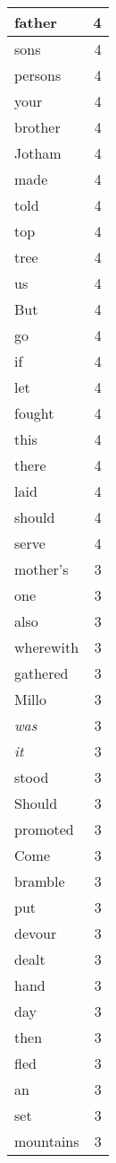 \begin{center}
\begin{longtable}{l|r}
father & 4\\ \hline 
sons & 4\\ \hline 
persons & 4\\ \hline 
your & 4\\ \hline 
brother & 4\\ \hline 
Jotham & 4\\ \hline 
made & 4\\ \hline 
told & 4\\ \hline 
top & 4\\ \hline 
tree & 4\\ \hline 
us & 4\\ \hline 
But & 4\\ \hline 
go & 4\\ \hline 
if & 4\\ \hline 
let & 4\\ \hline 
fought & 4\\ \hline 
this & 4\\ \hline 
there & 4\\ \hline 
laid & 4\\ \hline 
should & 4\\ \hline 
serve & 4\\ \hline 
mother's & 3\\ \hline 
one & 3\\ \hline 
also & 3\\ \hline 
wherewith & 3\\ \hline 
gathered & 3\\ \hline 
Millo & 3\\ \hline 
\emph{was} & 3\\ \hline 
\emph{it} & 3\\ \hline 
stood & 3\\ \hline 
Should & 3\\ \hline 
promoted & 3\\ \hline 
Come & 3\\ \hline 
bramble & 3\\ \hline 
put & 3\\ \hline 
devour & 3\\ \hline 
dealt & 3\\ \hline 
hand & 3\\ \hline 
day & 3\\ \hline 
then & 3\\ \hline 
fled & 3\\ \hline 
an & 3\\ \hline 
set & 3\\ \hline 
mountains & 3\\ \hline 

\end{longtable}
\end{center}
